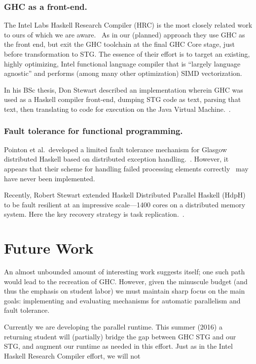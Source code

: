 \documentclass{llncs}
\begin{document}
\subsubsection{GHC as a front-end.}
The Intel Labs Haskell Research Compiler (HRC) is the most closely related
work to ours of which we are aware.~\cite{Liu:2013,Petersen:2013} As in our
(planned) approach they use GHC as the front end, but exit the GHC toolchain
at the final GHC Core stage, just before transformation to STG.  The essence
of their effort is to target an existing, highly optimizing, Intel functional
language compiler that is ``largely language agnostic'' and performs (among
many other optimization) SIMD vectorization.

In his BSc thesis, Don Stewart described an implementation wherein GHC was
used as a Haskell compiler front-end, dumping STG code as text, parsing that
text, then translating to code for execution on the Java Virtual
Machine.~\cite{Stewart-BSc}.

\subsubsection{Fault tolerance for functional programming.}
Pointon et al.\ developed a limited fault tolerance mechanism for Glasgow
distributed Haskell based on distributed exception
handling.~\cite{Pointon:2001}.  However, it appears that their scheme for
handling failed processing elements correctly~\cite{} may have never been
implemented.

Recently, Robert Stewart extended Haskell Distributed Parallel Haskell
(HdpH)~\cite{hdph} to be fault resilient at an impressive scale---1400 cores
on a distributed memory system.  Here the key recovery strategy is task
replication.~\cite{Stewart:2013}.

\section{Future Work}

An almost unbounded amount of interesting work suggests itself; one such path
would lead to the recreation of GHC.  However, given the minuscule budget (and
thus the emphasis on student labor) we must maintain sharp focus on the main
goals:  implementing and evaluating mechanisms for automatic parallelism and
fault tolerance.

Currently we are developing the parallel runtime.  This summer (2016) a
returning student will (partially) bridge the gap between GHC STG and our STG,
and augment our runtime as needed in this effort.  Just as in the Intel Haskell
Research Compiler effort, we will not 
\end{document}
